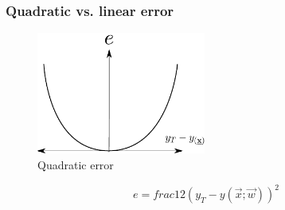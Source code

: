 \begin{frame}\frametitle{Quadratic vs. linear error}

\begin{figure}[h]
    \centering
    \includegraphics[height=4cm]{img/section1_fig17_quadratic.pdf}
    \caption{Quadratic error}
    \label{fig:quadratic_err}
\end{figure}

\begin{equation}
e = frac{1}{2} \left( y_{T} - y(\vec x;\vec w)\right)^{2}
\label{eq:quadratic_error}
\end{equation}

\end{frame}
